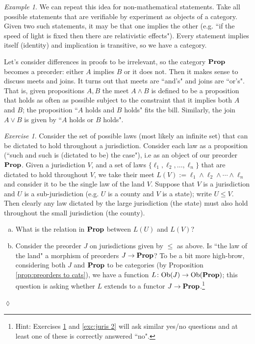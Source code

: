 \documentclass{book}
\def\tn{\textnormal}
\def\Ob{\tn{Ob}}
\def\to{\rightarrow}
\def\taking{\colon}
\def\Prop{{\bf Prop}}
\theoremstyle{remark}
\newtheorem{example}[subsubsection]{Example}
\newtheorem{exc}[subsubsection]{Exercise}
\newenvironment{exercise}{\begin{exc}}{\hspace*{\fill}$\lozenge$\end{exc}}
\theoremstyle{definition}
\def\sexc{\begin{enumerate}[a.)]\setlength{\itemsep}{.1cm}\setlength{\parskip}{.1cm}\item}
\def\next{\item}
\def\endsexc{\end{enumerate}}
\begin{document}
\begin{example}
We can repeat this idea for non-mathematical statements. Take all possible statements that are verifiable by experiment as objects of a category. Given two such statements, it may be that one implies the other (e.g. ``if the speed of light is fixed then there are relativistic effects"). Every statement implies itself (identity) and implication is transitive, so we have a category. 
\end{example}

Let's consider differences in proofs to be irrelevant, so the category $\Prop$ becomes a preorder: either $A$ implies $B$ or it does not. Then it makes sense to discuss meets and joins. It turns out that meets are ``and's" and joins are ``or's". That is, given propositions $A,B$ the meet $A\wedge B$ is defined to be a proposition that holds as often as possible subject to the constraint that it implies both $A$ and $B$; the proposition ``$A$ holds and $B$ holds" fits the bill. Similarly, the join $A\vee B$ is given by ``$A$ holds or $B$ holds".

\begin{exercise}\label{exc:juris 1}
Consider the set of possible laws (most likely an infinite set) that can be dictated to hold throughout a jurisdiction. Consider each law as a proposition (``such and such is (dictated to be) the case"), i.e as an object of our preorder $\Prop$. Given a jurisdiction $V$, and a set of laws $\{\ell_1,\ell_2,\ldots,\ell_n\}$ that are dictated to hold throughout $V$, we take their meet $L(V):=\ell_1\wedge\ell_2\wedge\cdots\wedge\ell_n$ and consider it to be the single law of the land $V$. Suppose that $V$ is a jurisdiction and $U$ is a sub-jurisdiction (e.g. $U$ is a county and $V$ is a state); write $U\leq V$. Then clearly any law dictated by the large jurisdiction (the state) must also hold throughout the small jurisdiction (the county).
\sexc What is the relation in $\Prop$ between $L(U)$ and $L(V)$?
\next Consider the preorder $J$ on jurisdictions given by $\leq$ as above. Is ``the law of the land" a morphism of preorders $J\to\Prop$? To be a bit more high-brow, considering both $J$ and $\Prop$ to be categories (by Proposition \ref{prop:preorders to cats}), we have a function $L\taking\Ob(J)\to\Ob(\Prop)$; this question is asking whether $L$ extends to a functor $J\to\Prop$.\footnote{Hint: Exercises \ref{exc:juris 1} and \ref{exc:juris 2} will ask similar yes/no questions and at least one of these is correctly answered ``no".}
\endsexc
\end{exercise}
\end{document}
